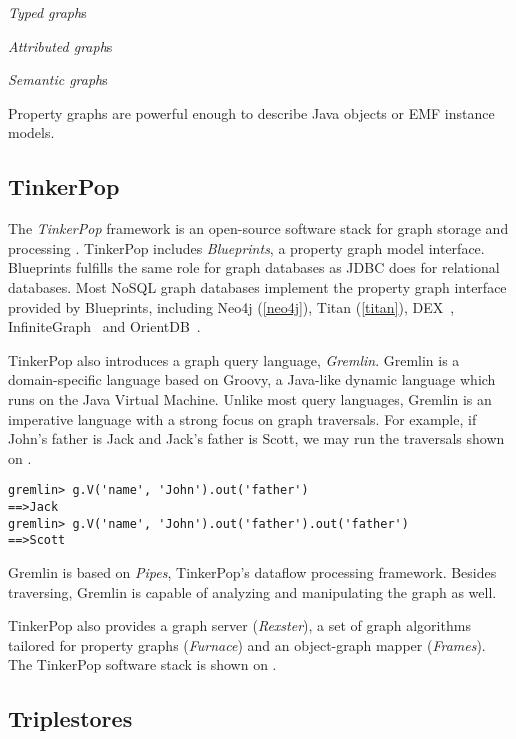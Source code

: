 \emph{Typed graph}s

\emph{Attributed graph}s

\emph{Semantic graph}s

Property graphs are powerful enough to describe Java objects or EMF instance models. 

\subsection{TinkerPop}

The \textit{TinkerPop} framework is an open-source software stack for graph storage and processing \cite{TinkerPop}. TinkerPop includes \textit{Blueprints}, a property graph model interface. Blueprints fulfills the same role for graph databases as JDBC does for relational databases. Most NoSQL graph databases implement the property graph interface provided by Blueprints, including Neo4j (\autoref{neo4j}), Titan (\autoref{titan}), DEX~\cite{DEX}, InfiniteGraph~\cite{InfiniteGraph} and OrientDB~\cite{OrientDB}.

 
TinkerPop also introduces a graph query language, \textit{Gremlin}. Gremlin is a domain-specific language based on Groovy, a Java-like dynamic language which runs on the Java Virtual Machine. Unlike most query languages, Gremlin is an imperative language with a strong focus on graph traversals. For example, if John's father is Jack and Jack's father is Scott, we may run the traversals shown on .

\begin{lstlisting}[caption=Simple Gremlin queries, label=lst:gremlin-queries]
gremlin> g.V('name', 'John').out('father')
==>Jack
gremlin> g.V('name', 'John').out('father').out('father')
==>Scott
\end{lstlisting}


Gremlin is based on \textit{Pipes}, TinkerPop's dataflow processing framework. Besides traversing, Gremlin is capable of analyzing and manipulating the graph as well.

TinkerPop also provides a graph server (\textit{Rexster}), a set of graph algorithms tailored for property graphs (\textit{Furnace}) and an object-graph mapper (\textit{Frames}). The TinkerPop software stack is shown on .


\subsection{Triplestores}


